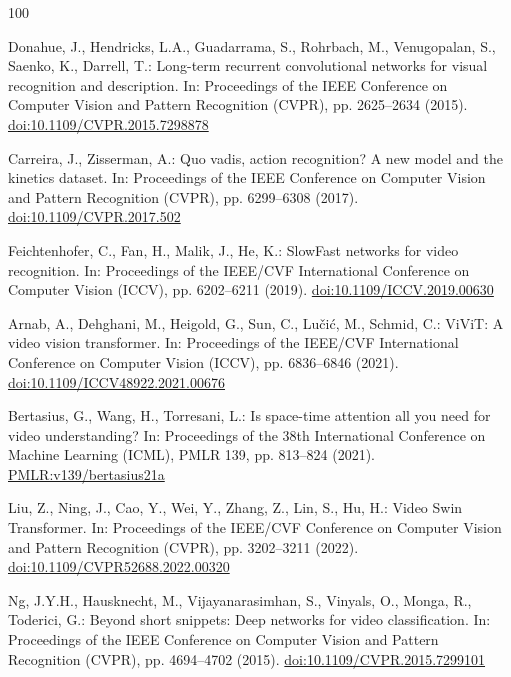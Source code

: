 \documentclass[preprint,12pt]{elsarticle}
\begin{document}
\begin{thebibliography}{100}

Donahue, J., Hendricks, L.A., Guadarrama, S., Rohrbach, M., Venugopalan, S., Saenko, K., Darrell, T.: Long-term recurrent convolutional networks for visual recognition and description. In: Proceedings of the IEEE Conference on Computer Vision and Pattern Recognition (CVPR), pp. 2625--2634 (2015). \href{https://doi.org/10.1109/CVPR.2015.7298878}{doi:10.1109/CVPR.2015.7298878}

Carreira, J., Zisserman, A.: Quo vadis, action recognition? A new model and the kinetics dataset. In: Proceedings of the IEEE Conference on Computer Vision and Pattern Recognition (CVPR), pp. 6299--6308 (2017). \href{https://doi.org/10.1109/CVPR.2017.502}{doi:10.1109/CVPR.2017.502}

Feichtenhofer, C., Fan, H., Malik, J., He, K.: SlowFast networks for video recognition. In: Proceedings of the IEEE/CVF International Conference on Computer Vision (ICCV), pp. 6202--6211 (2019). \href{https://doi.org/10.1109/ICCV.2019.00630}{doi:10.1109/ICCV.2019.00630}

Arnab, A., Dehghani, M., Heigold, G., Sun, C., Lu\v{c}i\'{c}, M., Schmid, C.: ViViT: A video vision transformer. In: Proceedings of the IEEE/CVF International Conference on Computer Vision (ICCV), pp. 6836--6846 (2021). \href{https://doi.org/10.1109/ICCV48922.2021.00676}{doi:10.1109/ICCV48922.2021.00676}

Bertasius, G., Wang, H., Torresani, L.: Is space-time attention all you need for video understanding? In: Proceedings of the 38th International Conference on Machine Learning (ICML), PMLR 139, pp. 813--824 (2021). \href{https://proceedings.mlr.press/v139/bertasius21a.html}{PMLR:v139/bertasius21a}

Liu, Z., Ning, J., Cao, Y., Wei, Y., Zhang, Z., Lin, S., Hu, H.: Video Swin Transformer. In: Proceedings of the IEEE/CVF Conference on Computer Vision and Pattern Recognition (CVPR), pp. 3202--3211 (2022). \href{https://doi.org/10.1109/CVPR52688.2022.00320}{doi:10.1109/CVPR52688.2022.00320}

Ng, J.Y.H., Hausknecht, M., Vijayanarasimhan, S., Vinyals, O., Monga, R., Toderici, G.: Beyond short snippets: Deep networks for video classification. In: Proceedings of the IEEE Conference on Computer Vision and Pattern Recognition (CVPR), pp. 4694--4702 (2015). \href{https://doi.org/10.1109/CVPR.2015.7299101}{doi:10.1109/CVPR.2015.7299101}


\end{thebibliography}
\end{document}
